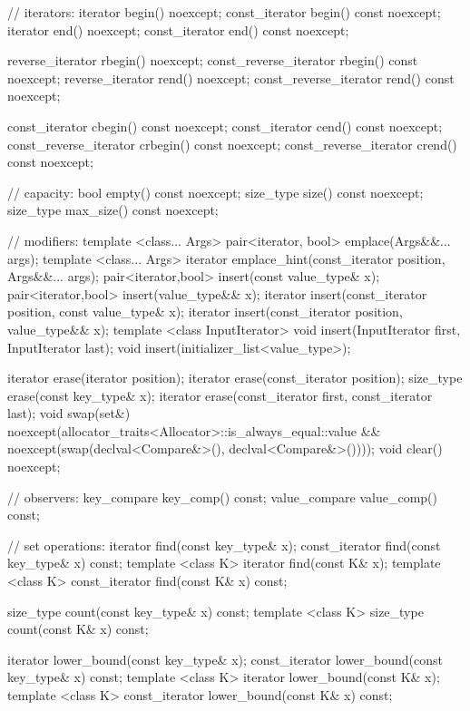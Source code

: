\begin{codeblock}
{{    // iterators:
    iterator               begin() noexcept;
    const_iterator         begin() const noexcept;
    iterator               end() noexcept;
    const_iterator         end() const noexcept;

    reverse_iterator       rbegin() noexcept;
    const_reverse_iterator rbegin() const noexcept;
    reverse_iterator       rend() noexcept;
    const_reverse_iterator rend() const noexcept;

    const_iterator         cbegin() const noexcept;
    const_iterator         cend() const noexcept;
    const_reverse_iterator crbegin() const noexcept;
    const_reverse_iterator crend() const noexcept;

    // capacity:
    bool      empty() const noexcept;
    size_type size() const noexcept;
    size_type max_size() const noexcept;

    // modifiers:
    template <class... Args> pair<iterator, bool> emplace(Args&&... args);
    template <class... Args> iterator emplace_hint(const_iterator position, Args&&... args);
    pair<iterator,bool> insert(const value_type& x);
    pair<iterator,bool> insert(value_type&& x);
    iterator insert(const_iterator position, const value_type& x);
    iterator insert(const_iterator position, value_type&& x);
    template <class InputIterator>
      void insert(InputIterator first, InputIterator last);
    void insert(initializer_list<value_type>);

    iterator  erase(iterator position);
    iterator  erase(const_iterator position);
    size_type erase(const key_type& x);
    iterator  erase(const_iterator first, const_iterator last);
    void      swap(set&)
      noexcept(allocator_traits<Allocator>::is_always_equal::value &&
               noexcept(swap(declval<Compare&>(), declval<Compare&>())));
    void      clear() noexcept;

    // observers:
    key_compare key_comp() const;
    value_compare value_comp() const;

    // set operations:
    iterator       find(const key_type& x);
    const_iterator find(const key_type& x) const;
    template <class K> iterator       find(const K& x);
    template <class K> const_iterator find(const K& x) const;

    size_type      count(const key_type& x) const;
    template <class K> size_type count(const K& x) const;

    iterator       lower_bound(const key_type& x);
    const_iterator lower_bound(const key_type& x) const;
    template <class K> iterator       lower_bound(const K& x);
    template <class K> const_iterator lower_bound(const K& x) const;

}}
\end{codeblock}
